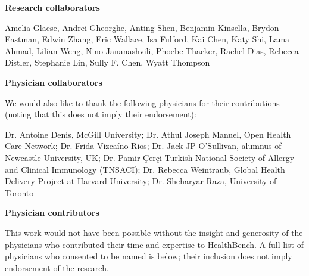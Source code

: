 \textbf{Research collaborators}

Amelia Glaese, Andrei Gheorghe, Anting Shen, Benjamin Kinsella, Brydon Eastman, Edwin Zhang, Eric Wallace, Isa Fulford, Kai Chen, Katy Shi, Lama Ahmad, Lilian Weng, Nino Jananashvili, Phoebe Thacker, Rachel Dias, Rebecca Distler, Stephanie Lin, Sully F. Chen, Wyatt Thompson

\textbf{Physician collaborators}

We would also like to thank the following physicians for their contributions (noting that this does not imply their endorsement):

Dr. Antoine Denis, McGill University; Dr. Athul Joseph Manuel, Open Health Care Network; Dr. Frida Vizcaíno-Rios; Dr. Jack JP O'Sullivan, alumnus of Newcastle University, UK; Dr. Pamir Çerçi Turkish National Society of Allergy and Clinical Immunology (TNSACI); Dr. Rebecca Weintraub, Global Health Delivery Project at Harvard University; Dr. Sheharyar Raza, University of Toronto

\textbf{Physician contributors}

This work would not have been possible without the insight and generosity of the physicians who contributed their time and expertise to HealthBench. A full list of physicians who consented to be named is below; their inclusion does not imply endorsement of the research.

